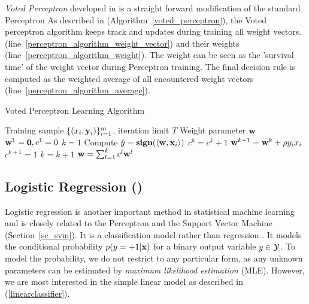 \textit{Voted Perceptron} developed in \citep{Freund99} is a straight forward modification of the standard Perceptron
As described in (Algorithm~\ref{voted_perceptron}), the Voted perceptron algorithm keeps track and updates during training all weight vectors. (line~\ref{perceptron_algorithm_weight_vector}) and their weights (line~\ref{perceptron_algorithm_weight}).
The weight can be seen as the 'survival time' of the weight vector during Perceptron training.
The final decision rule is computed as the weighted average of all encountered weight vectors (line~\ref{perceptron_algorithm_average}).
\begin{algorithm}
\caption{Voted Perceptron Learning Algorithm}
\label{voted_perceptron}
\begin{algorithmic}[1]
	\REQUIRE Training sample $\lbrace (x_i,\mathbf {y}_i)\rbrace_{i=1}^m$, iteration limit $T$
	\ENSURE Weight parameter $\mathbf {w}$
	\STATE $\mathbf {w}^{1}=\mathbf {0},c^1=0$
	\STATE $k=1$
			\STATE Compute $\hat{y} = \textbf{sign}(\langle \mathbf {w}, \mathbf {x}_i \rangle)$
				\STATE $c^k = c^k + 1$
			\ELSE
				\STATE $\mathbf {w}^{k+1} = \mathbf {w}^{k} + \rho y_ix_i$ \label{perceptron_algorithm_weight_vector}
				\STATE $c^{k+1} =1$ \label{perceptron_algorithm_weight}
				\STATE $k=k+1$
			\ENDIF
		\ENDFOR
	\ENDFOR
	\RETURN $\mathbf {w} = \sum_{l=1}^{k}c^l\mathbf {w}^{l}$ \label{perceptron_algorithm_average}
\end{algorithmic}
\end{algorithm}


%
\subsection{Logistic Regression (\lr)}

Logistic regression is another important method in statistical machine learning and is closely related to the Perceptron and the Support Vector Machine (Section~\ref{sc_svm}).
It is a classification model rather than regression \citep{Bishop07}.
It models the conditional probability $p(y=+1|\mathbf {x})$ for a binary output variable $y\in\mathcal{Y}$.
To model the probability, we do not restrict to any particular form, as any unknown parameters can be estimated by \textit{maximum likelihood estimation} (MLE).
However, we are most interested in the simple linear model as described in (\ref{linearclassifier}).

